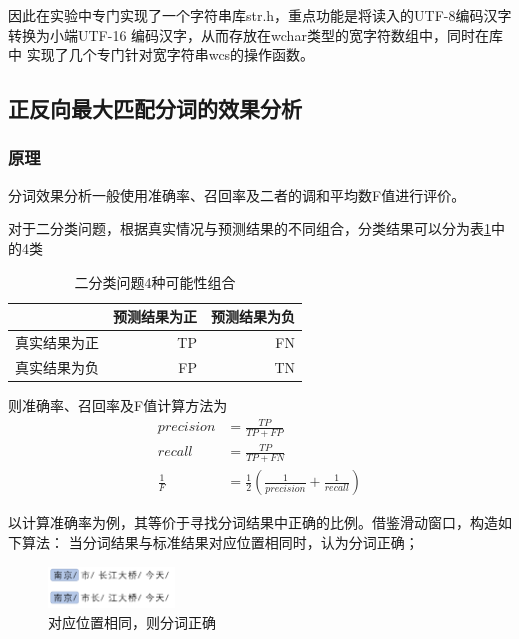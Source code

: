 因此在实验中专门实现了一个字符串库str.h，重点功能是将读入的UTF-8编码汉字转换为小端UTF-16
编码\citep{garfinkel2013detecting}汉字，从而存放在wchar类型的宽字符数组中，同时在库中
实现了几个专门针对宽字符串wcs的操作函数。

\subsection{正反向最大匹配分词的效果分析}

\subsubsection{原理}

分词效果分析一般使用准确率、召回率及二者的调和平均数F值进行评价。

对于二分类问题，根据真实情况与预测结果的不同组合，分类结果可以分为表\ref{TPFPFNTN}中的4类
\begin{table}[H]
  \centering
  \begin{tabular}{rrr}
    \hline
    \textbf{}    & \textbf{预测结果为正} & \textbf{预测结果为负} \\
    \hline
    真实结果为正 & TP                    & FN                    \\
    真实结果为负 & FP                    & TN                    \\
    \hline
  \end{tabular}
  \caption{二分类问题4种可能性组合}
  \label{TPFPFNTN}
\end{table}

则准确率、召回率及F值计算方法为
\begin{align}
  precision   & = \frac{TP}{TP + FP}                                            \\
  recall      & = \frac{TP}{TP + FN}                                            \\
  \frac{1}{F} & = \frac{1}{2} \left(\frac{1}{precision}+\frac{1}{recall}\right)
\end{align}

以计算准确率为例，其等价于寻找分词结果中正确的比例。借鉴滑动窗口，构造如下算法：
当分词结果与标准结果对应位置相同时，认为分词正确；

\begin{figure}[H]
  \centering
  \includegraphics[width=0.3\textwidth]{figures/figure_02.png}
  \caption{对应位置相同，则分词正确}
\end{figure}

